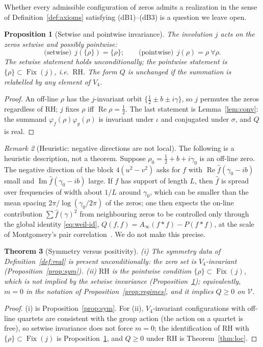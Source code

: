 \documentclass[11pt]{amsart}
\newtheorem{theorem}{Theorem}[section]
\newtheorem{proposition}[theorem]{Proposition}
\theoremstyle{definition}
\theoremstyle{remark}
\newtheorem{remark}[theorem]{Remark}
\newcommand{\RH}{\mathrm{RH}}
\renewcommand{\Re}{\operatorname{Re}}
\renewcommand{\Im}{\operatorname{Im}}
\newcommand{\half}{\tfrac12}
\newcommand{\fhat}{\widehat f}
\newcommand{\Fix}{\operatorname{Fix}}
\begin{document}
Whether every admissible configuration of zeros admits a realization in the sense of
Definition~\ref{def:axioms} satisfying \textnormal{(dB1)--(dB3)} is a question we leave open.

\begin{proposition}[Setwise and pointwise invariance]\label{prop:kappa}
The involution $j$ acts on the zeros setwise and possibly pointwise:
\[
\text{(setwise)}\ \ j(\{\rho\})=\{\rho\};\qquad
\text{(pointwise)}\ \ j(\rho)=\rho\ \forall\rho .
\]
The setwise statement holds unconditionally; the pointwise statement is $\{\rho\}\subset\Fix(j)$,
i.e.\ $\RH$. The form $Q$ is unchanged if the summation is relabelled by any element of $V_4$.
\end{proposition}
\begin{proof}
An off-line $\rho$ has the $j$-invariant orbit $\{\half\pm b\pm i\gamma\}$, so $j$ permutes the
zeros regardless of $\RH$; $j$ fixes $\rho$ iff $\Re\rho=\half$. The last statement is
Lemma~\ref{lem:conv}: the summand $\varphi_f(\rho)\varphi_g(\rho)$ is invariant under $\iota$ and
conjugated under $\sigma$, and $Q$ is real.
\end{proof}

\begin{remark}[Heuristic: negative directions are not local]\label{prop:local}
The following is a heuristic description, not a theorem. Suppose $\rho_0=\half+b+i\gamma_0$ is an
off-line zero. The negative direction of the block $4(u^2-v^2)$ asks for $f$ with
$\Re\fhat(\gamma_0-ib)$ small and $\Im\fhat(\gamma_0-ib)$ large. If $f$ has support of length
$L$, then $\fhat$ is spread over frequencies of width about $1/L$ around $\gamma_0$, which can be
smaller than the mean spacing $2\pi/\log(\gamma_0/2\pi)$ of the zeros; one then expects the
on-line contribution $\sum\fhat(\gamma)^2$ from neighbouring zeros to be controlled only through
the global identity \eqref{eq:weil-id}, $Q(f,f)=A_\infty(f*f)-P(f*f)$, at the scale of
Montgomery's pair correlation~\cite{Montgomery}. We do not make this precise.
\end{remark}

\begin{theorem}[Symmetry versus positivity]\label{thm:dichotomy}
\emph{(i)} The symmetry data of Definition~\ref{def:real} is present unconditionally: the zero set
is $V_4$-invariant (Proposition~\ref{prop:sym}). \emph{(ii)} $\RH$ is the pointwise condition
$\{\rho\}\subset\Fix(j)$, which is not implied by the setwise invariance
(Proposition~\ref{prop:kappa}); equivalently, $m=0$ in the notation of
Proposition~\ref{prop:regimes}, and it implies $Q\ge0$ on $\mathcal V$.
\end{theorem}
\begin{proof}
(i) is Proposition~\ref{prop:sym}. For (ii), $V_4$-invariant configurations with off-line quartets
are consistent with the group action (the action on a quartet is free), so setwise invariance
does not force $m=0$; the identification of $\RH$ with $\{\rho\}\subset\Fix(j)$ is
Proposition~\ref{prop:kappa}, and $Q\ge0$ under $\RH$ is Theorem~\ref{thm:loc}.
\end{proof}
\end{document}
